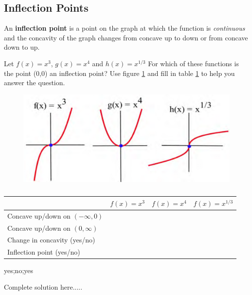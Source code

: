 \subsection*{Inflection Points}
\begin{tcolorbox}[title={Definition}]
An \textbf{inflection point} is a point on the graph at which the function is \emph{continuous} and the concavity of the graph changes from concave up to down or from concave down to up.
\end{tcolorbox}

\begin{example}
Let $f(x)=x^3$, $g(x)=x^4$ and $h(x)=x^{1/3}$ For which of these functions is the point (0,0) an inflection point? Use figure \ref{fig:inflection1} and fill in table \ref{table:inflection1} to help you answer the question.
\begin{figure}[h]
    \centering
    \caption{} 
    \includegraphics[scale=0.5]{images/2ndDervConcavity/inflection1.png} 
    \label{fig:inflection1}
\end{figure}
\begin{table}[h]
\centering
\begin{tabular}{ | m{5cm} | m{2cm}| m{2cm} | m{2cm}|} 
\hline
 &$f(x)=x^3$&$f(x)=x^4$& $f(x)=x^{1/3}$\\
\hline
Concave up/down on $(-\infty,0)$ & & & \\
\hline
Concave up/down on $(0,\infty)$ & & & \\ 
\hline
Change in concavity (yes/no) & & & \\ 
\hline
Inflection point (yes/no) & & & \\ 
\hline
\end{tabular}
\caption{}
\label{table:inflection1}
\end{table}
    \begin{sol}
    yes;no;yes
    \end{sol}
    \begin{solL}
    Complete solution here.....
    
    \end{solL}
    
\end{example}

